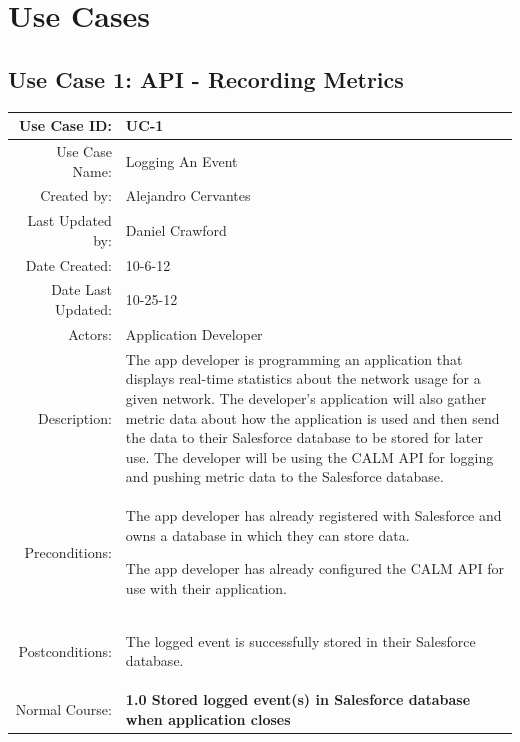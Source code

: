 \documentclass[12pt,oneside,letterpaper]{article}
\newenvironment{packed_enumerate}{ %
\vspace{-7mm}
\begin{enumerate}
  \setlength{\itemsep}{0pt}
  \setlength{\parskip}{0pt}
  \setlength{\parsep}{0pt}
}{\end{enumerate}
\vspace{-8mm}}
\begin{document}
\section{Use Cases}

\subsection{\label{UC-1}Use Case 1: API - Recording Metrics}
\begin{longtable}{|r|p{3.8in}|}
\hline
Use Case ID:&UC-1\\
\hline
Use Case Name:&Logging An Event\\
\hline
Created by:&Alejandro Cervantes\\
\hline
Last Updated by:&Daniel Crawford\\
\hline
Date Created:&10-6-12\\
\hline
Date Last Updated:&10-25-12\\
\hline
Actors:&Application Developer\\
\hline
Description:&The app developer is programming an application that 
displays real-time statistics about the network usage for a given 
network. The developer's application will also gather metric data 
about how the application is used and then send the data to their 
Salesforce database to be stored for later use. The developer will be 
using the CALM API for logging and pushing metric data to the Salesforce
database.\\
\hline
Preconditions:&
\begin{packed_enumerate}
\item The app developer has already registered with Salesforce and 
owns a database in which they can store data.
\item The app developer has already configured the CALM API for use 
with their application.
\end{packed_enumerate}\\
\hline
Postconditions:&
\begin{packed_enumerate}
\item The logged event is successfully stored in their Salesforce 
database.
\end{packed_enumerate}\\
\hline
Normal Course:&\textbf{1.0 Stored logged event(s) in Salesforce 
database when application closes}\\

\end{longtable}
\end{document}
